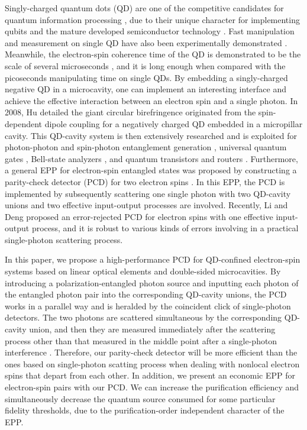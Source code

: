 \documentclass[aps,graphicx,twocolumn]{revtex4}%
\begin{document}
%





Singly-charged quantum dots (QD) are one of the competitive
candidates for quantum information processing
\cite{QD00,QD001,QD02}, due to their unique character for
implementing qubits and the mature developed semiconductor
technology \cite{QD01}.  Fast manipulation and measurement on single
QD have also been experimentally demonstrated \cite{QD03}.
Meanwhile, the electron-spin coherence time of the QD  is
demonstrated to be the scale of several microseconds \cite{QD04},
and it is long enough when compared with the picoseconds
manipulating time on single QDs. By embedding a singly-charged
negative QD in a microcavity, one can implement an interesting
interface and achieve the effective interaction between an electron
spin and a single photon. In 2008, Hu \cite{QD1} detailed the giant
circular birefringence originated from the spin-dependent dipole
coupling for a negatively charged QD embedded in a micropillar
cavity. This QD-cavity system is then extensively researched and is
exploited for photon-photon and spin-photon entanglement generation
\cite{QD2,QD.2,QD22}, universal  quantum gates
\cite{QD3,QD4,QD42,QD41,QDreview}, Bell-state analyzers
\cite{QD50,QD5,QD5add1,QD5add2}, and quantum transistors and routers
\cite{QDrout1,QDrout2}. Furthermore, a general EPP for electron-spin
entangled states was proposed by constructing a parity-check
detector (PCD) for two electron spins \cite{QDpcd1}. In this EPP,
the PCD is implemented by subsequently scattering one single photon
with two QD-cavity unions and two effective input-output processes
are involved. Recently, Li and Deng \cite{QDpcd2} proposed an
error-rejected PCD for electron spins with one effective
input-output process, and it is robust to various kinds of errors
involving in a practical single-photon scattering process.



In this paper, we propose a high-performance PCD for QD-confined electron-spin systems based on linear optical elements and double-sided microcavities. By introducing a polarization-entangled photon source and inputting each photon of the entangled photon pair into the corresponding QD-cavity unions, the PCD works in a parallel way and is heralded by the coincident click of single-photon detectors. The two photons are scattered simultaneous by the corresponding QD-cavity union, and then they are measured immediately after the scattering process other than that measured in the middle point after a single-photon interference \cite{QDpcd2}. Therefore, our parity-check detector will be more efficient than the ones based on single-photon scatting process when dealing with nonlocal electron spins that depart from each other. In addition, we present an economic EPP for electron-spin pairs with our PCD. We can increase the purification efficiency and simultaneously decrease the quantum source consumed for some particular fidelity thresholds, due to the purification-order independent character of the EPP.
\end{document}

